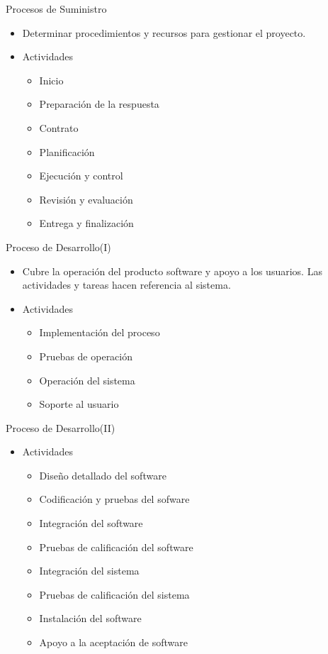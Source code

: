 \documentclass{beamer}
\begin{document}
			\begin{frame}{Procesos de Suministro}
				\begin{itemize}
					\item Determinar procedimientos y recursos para gestionar el proyecto.
					\item Actividades
					\begin{itemize}
						\item Inicio
						\item Preparación de la respuesta
						\item Contrato
						\item Planificación
						\item Ejecución y control
						\item Revisión y evaluación
						\item Entrega y finalización
					\end{itemize}
				\end{itemize}
			\end{frame}
			
			\begin{frame}{Proceso de Desarrollo(I)}
				\begin{itemize}
					\item Cubre la operación del producto software y apoyo a los usuarios. Las actividades y tareas hacen referencia al sistema.
					\item Actividades
					\begin{itemize}
						\item Implementación del proceso
						\item Pruebas de operación
						\item Operación del sistema
						\item Soporte al usuario
					\end{itemize}
				\end{itemize}
			\end{frame}
			
			
			\begin{frame}{Proceso de Desarrollo(II)}
				\begin{itemize}
					\item Actividades
					\begin{itemize}
		 				\item Diseño detallado del software
						\item Codificación y pruebas del sofware
						\item Integración del software
						\item Pruebas de calificación del software
						\item Integración del sistema
						\item Pruebas de calificación del sistema
						\item Instalación del software
						\item Apoyo a la aceptación de software
					\end{itemize}
				\end{itemize}
			\end{frame}
			
\end{document}
